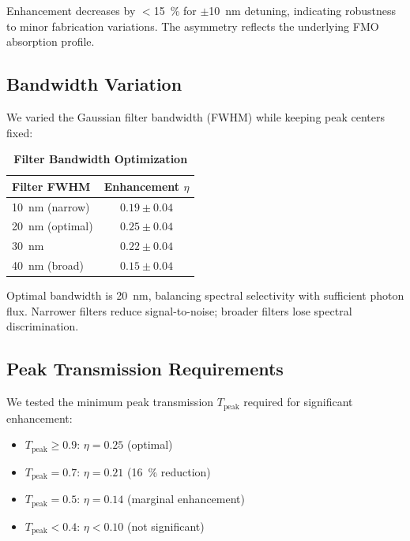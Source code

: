 \documentclass[11pt,a4paper]{article}
\begin{document}
Enhancement decreases by $<$\SI{15}{\percent} for $\pm$\SI{10}{\nano\meter} detuning, indicating robustness to minor fabrication variations. The asymmetry reflects the underlying FMO absorption profile.

\subsection{Bandwidth Variation}

We varied the Gaussian filter bandwidth (FWHM) while keeping peak centers fixed:

\begin{table}[h]
\centering
\caption{\textbf{Filter Bandwidth Optimization}}
\label{tab:SI_bandwidth}
\begin{tabular}{lc}
\toprule
\textbf{Filter FWHM} & \textbf{Enhancement $\eta$} \\
\midrule
\SI{10}{\nano\meter} (narrow) & $0.19 \pm 0.04$ \\
\SI{20}{\nano\meter} (optimal) & $0.25 \pm 0.04$ \\
\SI{30}{\nano\meter} & $0.22 \pm 0.04$ \\
\SI{40}{\nano\meter} (broad) & $0.15 \pm 0.04$ \\
\bottomrule
\end{tabular}
\end{table}

Optimal bandwidth is \SI{20}{\nano\meter}, balancing spectral selectivity with sufficient photon flux. Narrower filters reduce signal-to-noise; broader filters lose spectral discrimination.

\subsection{Peak Transmission Requirements}

We tested the minimum peak transmission $T_{\mathrm{peak}}$ required for significant enhancement:

\begin{itemize}
    \item $T_{\mathrm{peak}} \geq 0.9$: $\eta = 0.25$ (optimal)
    \item $T_{\mathrm{peak}} = 0.7$: $\eta = 0.21$ (\SI{16}{\percent} reduction)
    \item $T_{\mathrm{peak}} = 0.5$: $\eta = 0.14$ (marginal enhancement)
    \item $T_{\mathrm{peak}} < 0.4$: $\eta < 0.10$ (not significant)
\end{itemize}
\end{document}
